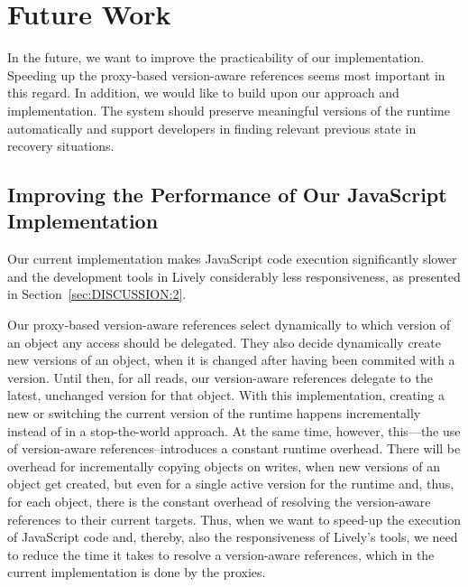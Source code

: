 

\chapter{Future Work} \label{chapter:FUTURE_WORK}

In the future, we want to improve the practicability of our implementation.
Speeding up the proxy-based version-aware references seems most important in this regard.
In addition, we would like to build upon our approach and implementation.
The system should preserve meaningful versions of the runtime automatically and support developers in finding relevant previous state in recovery situations.

\section{Improving the Performance of Our JavaScript Implementation} \label{sec:FUTURE_WORK:1}

Our current implementation makes JavaScript code execution significantly slower and the development tools in Lively considerably less responsiveness, as presented in Section~\ref{sec:DISCUSSION:2}.

Our proxy-based version-aware references select dynamically to which version of an object any access should be delegated.
They also decide dynamically create new versions of an object, when it is changed after having been commited with a version.
Until then, for all reads, our version-aware references delegate to the latest, unchanged version for that object.
With this implementation, creating a new or switching the current version of the runtime happens incrementally instead of in a stop-the-world approach.
At the same time, however, this---the use of version-aware references--introduces a constant runtime overhead.
There will be overhead for incrementally copying objects on writes, when new versions of an object get created, but even for a single active version for the runtime and, thus, for each object, there is the constant overhead of resolving the version-aware references to their current targets.
Thus, when we want to speed-up the execution of JavaScript code and, thereby, also the responsiveness of Lively's tools, we need to reduce the time it takes to resolve a version-aware references, which in the current implementation is done by the proxies.

